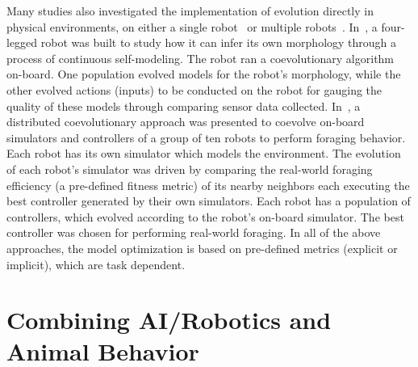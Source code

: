 Many studies also investigated the implementation of evolution directly in physical environments, on either a single robot~\cite{ Bongard-etal2006:science, Koos2013, Cully2015} or multiple robots~\cite{Alan2014}. In~\cite{Bongard-etal2006:science}, a four-legged robot was built to study how it can infer its own morphology through a process of continuous self-modeling. The robot ran a coevolutionary algorithm on-board. One population evolved models for the robot's morphology, while the other evolved actions (inputs) to be conducted on the robot for gauging the quality of these models through comparing sensor data collected. In~\cite{Alan2014}, a distributed coevolutionary approach was presented to coevolve on-board simulators and controllers of a group of ten robots to perform foraging behavior. Each robot has its own simulator which models the environment. The evolution of each robot's simulator was driven by comparing the real-world foraging efficiency (a pre-defined fitness metric) of its nearby neighbors each executing the best controller generated by their own simulators. Each robot has a population of controllers, which evolved according to the robot's on-board simulator. The best controller was chosen for performing real-world foraging. In all of the above approaches, the model optimization is based on pre-defined metrics (explicit or implicit), which are task dependent.


\section{Combining AI/Robotics and Animal Behavior}\label{sec:combine_AI_robotics_animal_behavior}

